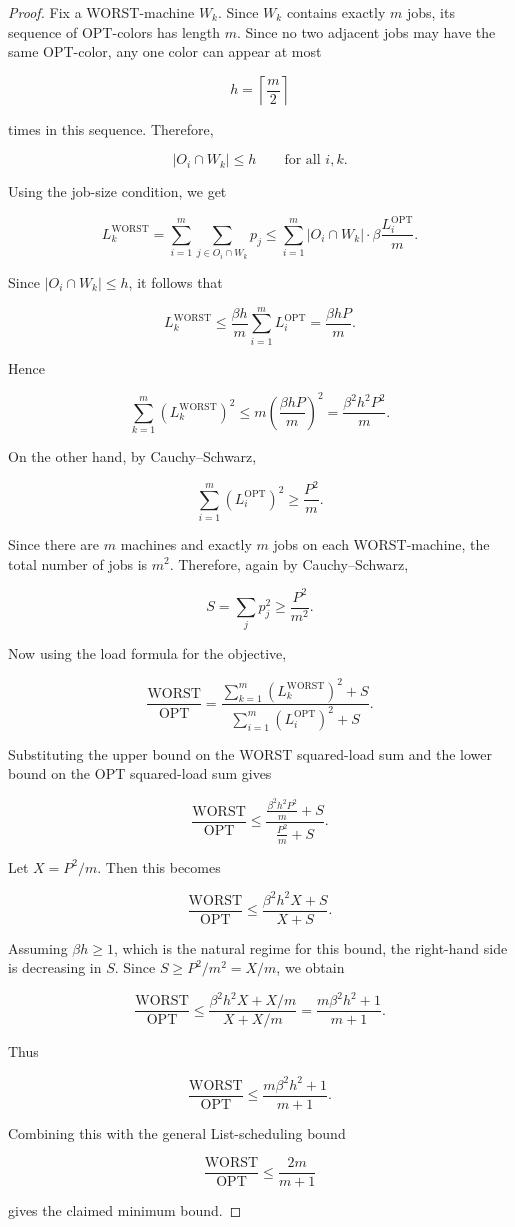 \documentclass[11pt]{article}
\newcommand{\OPT}{\mathrm{OPT}}
\newcommand{\WORST}{\mathrm{WORST}}
\begin{document}
\begin{proof}
Fix a WORST-machine \(W_k\). Since \(W_k\) contains exactly \(m\) jobs, its sequence of
OPT-colors has length \(m\). Since no two adjacent jobs may have the same OPT-color, any
one color can appear at most

\[
h=\left\lceil \frac m2\right\rceil
\]

times in this sequence. Therefore,

\[
|O_i\cap W_k|\le h
\qquad
\text{for all } i,k.
\]

Using the job-size condition, we get

\[
L_k^{\WORST}
=
\sum_{i=1}^m \sum_{j\in O_i\cap W_k} p_j
\le
\sum_{i=1}^m |O_i\cap W_k| \cdot \beta \frac{L_i^{\OPT}}{m}.
\]

Since \(|O_i\cap W_k|\le h\), it follows that

\[
L_k^{\WORST}
\le
\frac{\beta h}{m}\sum_{i=1}^m L_i^{\OPT}
=
\frac{\beta hP}{m}.
\]

Hence

\[
\sum_{k=1}^m \left(L_k^{\WORST}\right)^2
\le
m\left(\frac{\beta hP}{m}\right)^2
=
\frac{\beta^2h^2P^2}{m}.
\]

On the other hand, by Cauchy--Schwarz,

\[
\sum_{i=1}^m \left(L_i^{\OPT}\right)^2
\ge
\frac{P^2}{m}.
\]

Since there are \(m\) machines and exactly \(m\) jobs on each WORST-machine, the total
number of jobs is \(m^2\). Therefore, again by Cauchy--Schwarz,

\[
S=\sum_j p_j^2
\ge
\frac{P^2}{m^2}.
\]

Now using the load formula for the objective,

\[
\frac{\WORST}{\OPT}
=
\frac{
\sum_{k=1}^m (L_k^{\WORST})^2+S
}{
\sum_{i=1}^m (L_i^{\OPT})^2+S
}.
\]

Substituting the upper bound on the WORST squared-load sum and the lower bound on the
OPT squared-load sum gives

\[
\frac{\WORST}{\OPT}
\le
\frac{
\frac{\beta^2h^2P^2}{m}+S
}{
\frac{P^2}{m}+S
}.
\]

Let \(X=P^2/m\). Then this becomes

\[
\frac{\WORST}{\OPT}
\le
\frac{\beta^2h^2 X+S}{X+S}.
\]

Assuming \(\beta h\ge 1\), which is the natural regime for this bound, the right-hand side
is decreasing in \(S\). Since \(S\ge P^2/m^2=X/m\), we obtain

\[
\frac{\WORST}{\OPT}
\le
\frac{\beta^2h^2 X+X/m}{X+X/m}
=
\frac{m\beta^2h^2+1}{m+1}.
\]

Thus

\[
\frac{\WORST}{\OPT}
\le
\frac{m\beta^2 h^2+1}{m+1}.
\]

Combining this with the general List-scheduling bound

\[
\frac{\WORST}{\OPT}\le \frac{2m}{m+1}
\]

gives the claimed minimum bound.
\end{proof}
\end{document}

